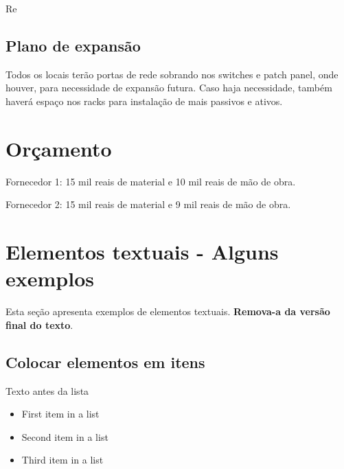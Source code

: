 \documentclass[	DIV=calc,%
							paper=a4,%
							fontsize=12pt,%
							onecolumn]{scrartcl}	 					%
\begin{document}

Re%

\subsection{Plano de expansão}
Todos os locais terão portas de rede sobrando nos switches e patch panel, onde houver, para necessidade de expansão futura. Caso haja necessidade, também haverá espaço nos racks para instalação de mais passivos e ativos.

\section{Orçamento}
Fornecedor 1: 15 mil reais de material e 10 mil reais de mão de obra.


Fornecedor 2: 15 mil reais de material e 9 mil reais de mão de obra.





\section{Elementos textuais - Alguns exemplos}
Esta seção apresenta exemplos de elementos textuais. \textbf{Remova-a da versão final do texto}.
\subsection{Colocar elementos em itens}
Texto antes da lista
\begin{itemize}
	\item First item in a list 
	\item Second item in a list 
	\item Third item in a list
\end{itemize}
\end{document}
